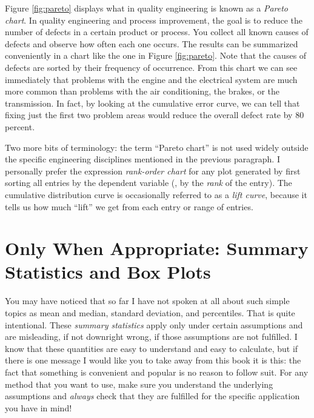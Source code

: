 Figure \ref{fig:pareto} displays what in quality engineering is known
as a \emph{Pareto chart}.  In quality engineering and
process improvement,\vadjust{\pagebreak} the goal is to reduce the number of defects in
a certain product or process. You collect all known causes of defects and
observe how often each one occurs. The results can be summarized
conveniently in a chart like the one in Figure \ref{fig:pareto}. Note
that the causes of defects are sorted by their frequency of
occurrence. From this chart we can see immediately that problems with
the engine and the electrical system are much more common than
problems\vadjust{\pagebreak} with the air conditioning, the brakes, or the transmission.
In fact, by looking at the cumulative error curve, we can tell that
fixing just the first two problem areas would reduce the overall
defect rate by 80 percent.

Two more bits of terminology: the term ``Pareto chart'' is not used
widely outside the specific engineering disciplines mentioned in the
previous paragraph. I personally prefer the expression
\emph{rank-order chart} for any plot generated by first sorting all
entries by the dependent variable (\ie, by the \emph{rank} of the
entry). The cumulative distribution curve is occasionally referred to
as a \emph{lift curve},  because it tells us how much ``lift'' we get
from each entry or range of entries.
      

\section{Only When Appropriate: Summary Statistics and Box Plots}

   
You may have noticed that so far I have not spoken at all about such
simple topics as mean and median, standard deviation, and 
percentiles. 
That is quite intentional. These \emph{summary statistics} apply only
under certain assumptions and are misleading, if not downright wrong,
if those assumptions are not fulfilled. I know that these quantities
are easy to understand and easy to calculate, but if there is one
message I would like you to take away from this book it is this: the
fact that something is convenient and popular is no reason to follow
suit. For any method that you want to use, make sure you understand
the underlying assumptions and \emph{always} check that they are
fulfilled for the specific application you have in mind!

